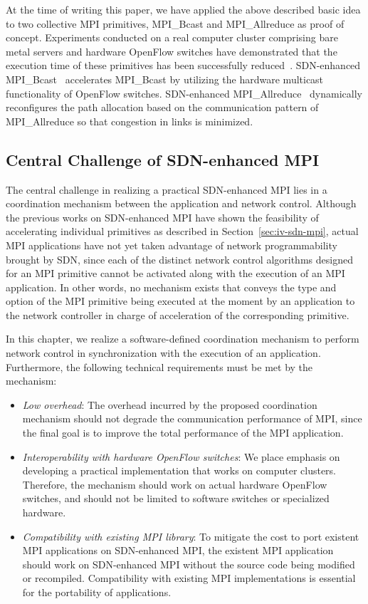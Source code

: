 At the time of writing this paper, we have applied the above described
basic idea to two collective MPI primitives, MPI\_Bcast and
MPI\_Allreduce as proof of concept. Experiments conducted on a real
computer cluster comprising bare metal servers and hardware OpenFlow
switches have demonstrated that the execution time of these primitives
has been successfully reduced~\autocites{Dashdavaa2013}{Takahashi2014}.
SDN-enhanced MPI\_Bcast~\autocite{Dashdavaa2013} accelerates MPI\_Bcast
by utilizing the hardware multicast functionality of OpenFlow switches.
SDN-enhanced MPI\_Allreduce~\autocite{Takahashi2014} dynamically
reconfigures the path allocation based on the communication pattern of
MPI\_Allreduce so that congestion in links is minimized.

\subsection{Central Challenge of SDN-enhanced MPI}

The central challenge in realizing a practical SDN-enhanced MPI lies in
a coordination mechanism between the application and network control.
Although the previous works on SDN-enhanced MPI have shown the
feasibility of accelerating individual primitives as described in
Section~\ref{sec:iv-sdn-mpi}, actual MPI applications have not yet
taken advantage of network programmability brought by SDN, since each of
the distinct network control algorithms designed for an MPI primitive
cannot be activated along with the execution of an MPI application. In
other words, no mechanism exists that conveys the type and option of the
MPI primitive being executed at the moment by an application to the
network controller in charge of acceleration of the corresponding
primitive.

In this chapter, we realize a software-defined coordination mechanism to
perform network control in synchronization with the execution of an
application. Furthermore, the following technical requirements must be
met by the mechanism:

\begin{itemize}
\item
  \emph{Low overhead}: The overhead incurred by the proposed coordination
  mechanism should not degrade the communication performance of MPI, since the
  final goal is to improve the total performance of the MPI application.
\item
  \emph{Interoperability with hardware OpenFlow switches}: We place emphasis
  on developing a practical implementation that works on computer clusters.
  Therefore, the mechanism should work on actual hardware OpenFlow switches,
  and should not be limited to software switches or specialized hardware.
\item
  \emph{Compatibility with existing MPI library}: To mitigate the
  cost to port existent MPI applications on SDN-enhanced MPI, the existent MPI
  application should work on SDN-enhanced MPI without the source code being
  modified or recompiled. Compatibility with existing MPI implementations is
  essential for the portability of applications.
\end{itemize}

